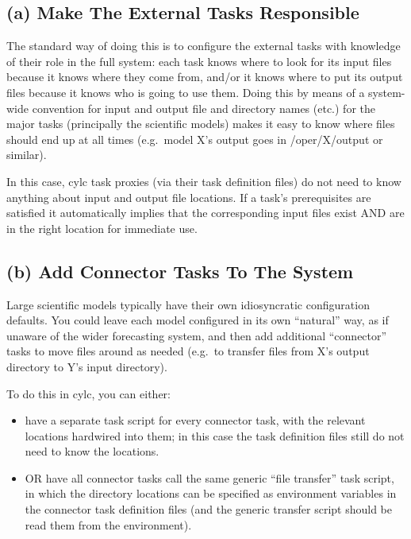 \documentclass[11pt,a4paper]{article}
\begin{document}
\subsection{(a) Make The External Tasks Responsible }

The standard way of doing this is to configure the external tasks with
knowledge of their role in the full system: each task knows where to
look for its input files because it knows where they come from, and/or
it knows where to put its output files because it knows who is going to
use them. Doing this by means of a system-wide convention for input and
output file and directory names (etc.) for the major tasks (principally
the scientific models) makes it easy to know where files should end up
at all times (e.g.\ model X's output goes in /oper/X/output or similar).

In this case, cylc task proxies (via their task definition files) do not
need to know anything about input and output file locations. If a task's
prerequisites are satisfied it automatically implies that the
corresponding input files exist AND are in the right location for
immediate use.

\subsection{(b) Add Connector Tasks To The System} 

Large scientific models typically have their own idiosyncratic
configuration defaults. You could leave each model configured in its own
``natural'' way, as if unaware of the wider forecasting system, and then
add additional ``connector'' tasks to move files around as needed
(e.g.\ to transfer files from X's output directory to Y's input directory).

To do this in cylc, you can either:

\begin{itemize}
    \item have a separate task script for every connector task, with the
        relevant locations hardwired into them; in this case the task
        definition files still do not need to know the locations.
    \item OR have all connector tasks call the same generic ``file
        transfer'' task script, in which the directory locations can be
        specified as environment variables in the connector task
        definition files (and the generic transfer script should be read
        them from the environment).
\end{itemize}
\end{document}
